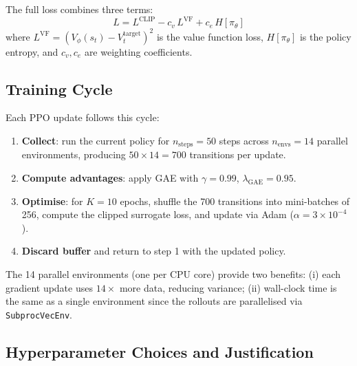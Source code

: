 \documentclass[11pt]{article}
\begin{document}
The full loss combines three terms:
\begin{equation}
    L = L^{\text{CLIP}} - c_v \, L^{\text{VF}} + c_e \, H[\pi_\theta]
\end{equation}
where $L^{\text{VF}} = (V_\phi(s_t) - V_t^{\text{target}})^2$ is the value function loss, $H[\pi_\theta]$ is the policy entropy, and $c_v, c_e$ are weighting coefficients.

\subsection{Training Cycle}

Each PPO update follows this cycle:
\begin{enumerate}[nosep]
    \item \textbf{Collect}: run the current policy for $n_{\text{steps}} = 50$ steps across $n_{\text{envs}} = 14$ parallel environments, producing $50 \times 14 = 700$ transitions per update.
    \item \textbf{Compute advantages}: apply GAE with $\gamma=0.99$, $\lambda_{\text{GAE}}=0.95$.
    \item \textbf{Optimise}: for $K = 10$ epochs, shuffle the 700 transitions into mini-batches of 256, compute the clipped surrogate loss, and update via Adam ($\alpha = 3 \times 10^{-4}$).
    \item \textbf{Discard buffer} and return to step 1 with the updated policy.
\end{enumerate}

The 14 parallel environments (one per CPU core) provide two benefits: (i) each gradient update uses $14\times$ more data, reducing variance; (ii) wall-clock time is the same as a single environment since the rollouts are parallelised via \texttt{SubprocVecEnv}.

\subsection{Hyperparameter Choices and Justification}
\end{document}
